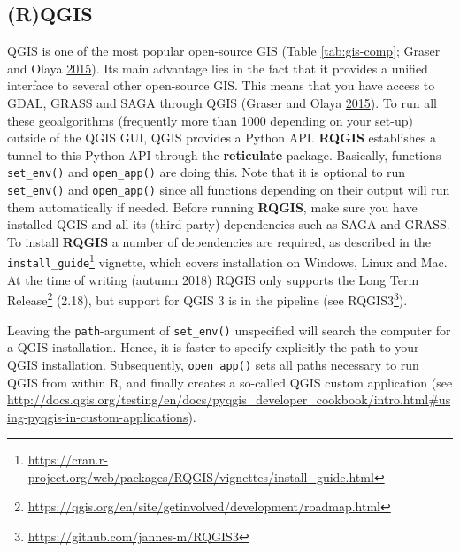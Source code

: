 \documentclass[]{krantz}
\newenvironment{Shaded}{\begin{snugshade}}{\end{snugshade}}
\newcommand{\CommentTok}[1]{\textcolor[rgb]{0.37,0.37,0.37}{\textit{#1}}}
\newcommand{\DataTypeTok}[1]{\textcolor[rgb]{0.27,0.27,0.27}{#1}}
\newcommand{\KeywordTok}[1]{\textcolor[rgb]{0.27,0.27,0.27}{\textbf{#1}}}
\newcommand{\NormalTok}[1]{#1}
\newcommand{\OtherTok}[1]{\textcolor[rgb]{0.37,0.37,0.37}{#1}}
\let\rmarkdownfootnote\footnote%
\def\footnote{\protect\rmarkdownfootnote}
\renewcommand{\href}[2]{#2\footnote{\url{#1}}}
\begin{document}
\hypertarget{rqgis}{%
\subsection{(R)QGIS}\label{rqgis}}

QGIS is one of the most popular open-source GIS (Table \ref{tab:gis-comp}; Graser and Olaya \protect\hyperlink{ref-graser_processing_2015}{2015}).
Its main advantage lies in the fact that it provides a unified interface to several other open-source GIS.
This means that you have access to GDAL, GRASS and SAGA through QGIS (Graser and Olaya \protect\hyperlink{ref-graser_processing_2015}{2015}).
To run all these geoalgorithms (frequently more than 1000 depending on your set-up) outside of the QGIS GUI, QGIS provides a Python API.
\textbf{RQGIS} establishes a tunnel to this Python API through the \textbf{reticulate} package.
Basically, functions \texttt{set\_env()} and \texttt{open\_app()} are doing this.
Note that it is optional to run \texttt{set\_env()} and \texttt{open\_app()} since all functions depending on their output will run them automatically if needed.
Before running \textbf{RQGIS}, make sure you have installed QGIS and all its (third-party) dependencies such as SAGA and GRASS.
To install \textbf{RQGIS} a number of dependencies are required, as described in the \href{https://cran.r-project.org/web/packages/RQGIS/vignettes/install_guide.html}{\texttt{install\_guide}} vignette, which covers installation on Windows, Linux and Mac.
At the time of writing (autumn 2018) RQGIS only supports the \href{https://qgis.org/en/site/getinvolved/development/roadmap.html}{Long Term Release} (2.18), but support for QGIS 3 is in the pipeline (see \href{https://github.com/jannes-m/RQGIS3}{RQGIS3}).

\begin{Shaded}
\end{Shaded}

Leaving the \texttt{path}-argument of \texttt{set\_env()} unspecified will search the computer for a QGIS installation.
Hence, it is faster to specify explicitly the path to your QGIS installation.
Subsequently, \texttt{open\_app()} sets all paths necessary to run QGIS from within R, and finally creates a so-called QGIS custom application (see \url{http://docs.qgis.org/testing/en/docs/pyqgis_developer_cookbook/intro.html\#using-pyqgis-in-custom-applications}).
\end{document}
